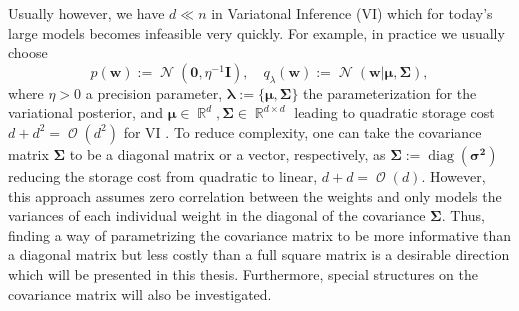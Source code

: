\documentclass[a4paper, 11pt, oneside]{scrartcl}
\theoremstyle{break}
\DeclareMathOperator{\Normal}{\mathcal{N}}
\DeclareMathOperator{\Real}{\mathbb{R}}
\DeclareMathOperator{\diag}{diag}
\DeclareMathOperator{\BigO}{\mathcal{O}}
\newcommand{\matr}[1]{\boldsymbol{#1}}
\numberwithin{equation}{section}
\begin{document}
			Usually however, we have $d \ll n$ in Variatonal Inference (VI) which for today's large models becomes infeasible very quickly. 
			For example, in practice we usually choose 
			\begin{equation}
				p(\matr{w}) := \Normal(\matr{0}, \eta^{-1} \matr{I}), \quad q_{\lambda}(\matr{w}) := \Normal(\matr{w} | \matr{\mu}, \matr{\Sigma}),
				\label{eqn:VI_Normal}
			\end{equation}
			where $\eta > 0$ a precision parameter, $\matr{\lambda} := \{\matr{\mu}, \matr{\Sigma}\}$ the parameterization for the variational posterior, and $\matr{\mu} \in \Real^d, \matr{\Sigma} \in \Real^{d \times d}$ leading to quadratic storage cost $d + d^2 = \BigO(d^2)$ for VI \parencite{ZSD+17, KNT+18, LSK20}.
			To reduce complexity, one can take the covariance matrix $\matr{\Sigma}$ to be a diagonal matrix or a vector, respectively, as $\matr{\Sigma} := \diag(\matr{\sigma^2})$ reducing the storage cost from quadratic to linear, $d + d = \BigO(d)$. 
			However, this approach assumes zero correlation between the weights and only models the variances of each individual weight in the diagonal of the covariance $\matr{\Sigma}$. 
			Thus, finding a way of parametrizing the covariance matrix to be more informative than a diagonal matrix but less costly than a full square matrix is a desirable direction which will be presented in this thesis.
			Furthermore, special structures on the covariance matrix will also be investigated. 
\end{document}
